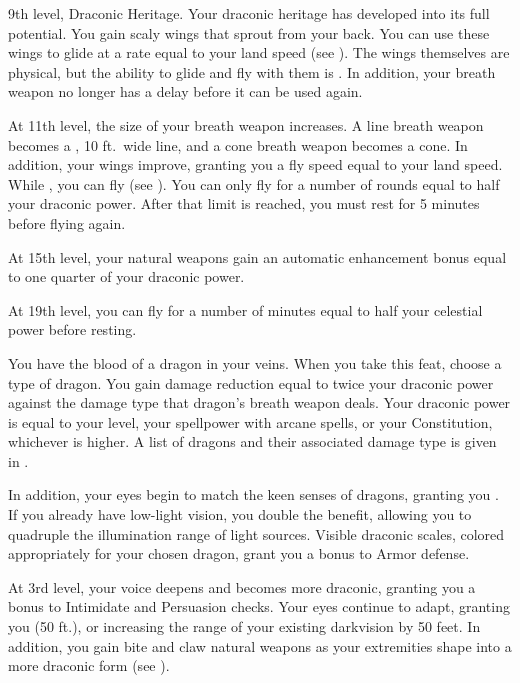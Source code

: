     \featpres 9th level, Draconic Heritage.
    \featben Your draconic heritage has developed into its full potential.
    You gain scaly wings that sprout from your back.
    You can use these wings to glide at a rate equal to your land speed (see ).
    The wings themselves are physical, but the ability to glide and fly with them is .
    In addition, your breath weapon no longer has a delay before it can be used again.

    At 11th level, the size of your breath weapon increases.
    A line breath weapon becomes a \areahuge, 10 ft.\ wide line, and a cone breath weapon becomes a \arealarge cone.
    In addition, your wings improve, granting you a fly speed equal to your land speed.
    While \unencumbered, you can fly (see ).
    You can only fly for a number of rounds equal to half your draconic power.
    After that limit is reached, you must rest for 5 minutes before flying again.

    At 15th level, your natural weapons gain an automatic enhancement bonus equal to one quarter of your draconic power. \magical

    At 19th level, you can fly for a number of minutes equal to half your celestial power before resting. \magical

    \featben You have the blood of a dragon in your veins.
    When you take this feat, choose a type of dragon.
    You gain damage reduction equal to twice your draconic power against the damage type that dragon's breath weapon deals.
    Your draconic power is equal to your level, your spellpower with arcane spells, or your Constitution, whichever is higher.
    A list of dragons and their associated damage type is given in .

    In addition, your eyes begin to match the keen senses of dragons, granting you .
    If you already have low-light vision, you double the benefit, allowing you to quadruple the illumination range of light sources.
    Visible draconic scales, colored appropriately for your chosen dragon, grant you a  bonus to Armor defense.

    At 3rd level, your voice deepens and becomes more draconic, granting you a  bonus to Intimidate and Persuasion checks.
    Your eyes continue to adapt, granting you  (50 ft.), or increasing the range of your existing darkvision by 50 feet.
    In addition, you gain bite and claw natural weapons as your extremities shape into a more draconic form (see ).

